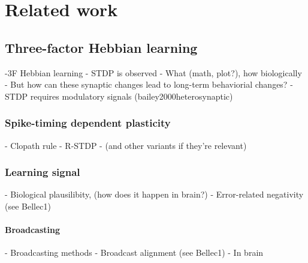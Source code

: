 \chapter{Related work}\label{ch:relatedwork}

\section{Three-factor Hebbian learning}
    \begin{tcolorbox}[colback=orange]
    -3F Hebbian learning
      - STDP is observed
        - What (math, plot?), how biologically
      - But how can these synaptic changes lead to long-term behaviorial changes?
      - STDP requires modulatory signals (bailey2000heterosynaptic)

    \end{tcolorbox}

    \subsection{Spike-timing dependent plasticity}
        \begin{tcolorbox}[colback=orange]
        - Clopath rule
        - R-STDP
        - (and other variants if they're relevant)


        \end{tcolorbox}


    \subsection{Learning signal}
        \begin{tcolorbox}[colback=orange]
        - Biological plausilibity, (how does it happen in brain?)
        - Error-related negativity (see Bellec1)

        \end{tcolorbox}

        \subsubsection{Broadcasting}

            \begin{tcolorbox}[colback=orange]
            - Broadcasting methods
              - Broadcast alignment (see Bellec1)
              - In brain

            \end{tcolorbox}


